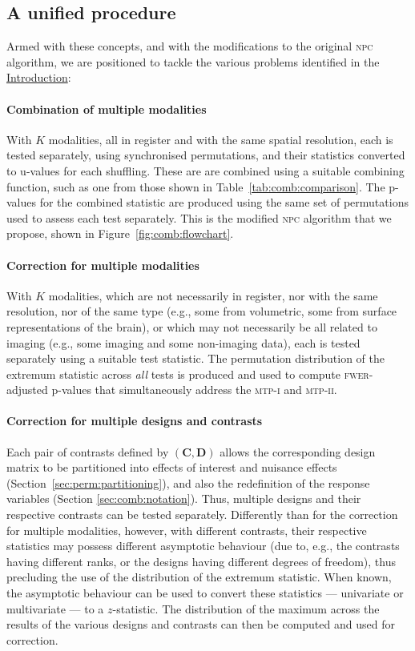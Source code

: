 \subsection{A unified procedure}

Armed with these concepts, and with the modifications to the original \textsc{npc} algorithm, we are positioned to tackle the various problems identified in the \href{sec:comb:intro}{Introduction}:

\paragraph{Combination of multiple modalities} With $K$ modalities, all in register and with the same spatial resolution, each is tested separately, using synchronised permutations, and their statistics converted to u-values for each shuffling. These are are combined using a suitable combining function, such as one from those shown in Table~\ref{tab:comb:comparison}. The p-values for the combined statistic are produced using the same set of permutations used to assess each test separately. This is the modified \textsc{npc} algorithm that we propose, shown in Figure~\ref{fig:comb:flowchart}.

\paragraph{Correction for multiple modalities} With $K$ modalities, which are not necessarily in register, nor with the same resolution, nor of the same type (e.g., some from volumetric, some from surface representations of the brain), or which may not necessarily be all related to imaging (e.g., some imaging and some non-imaging data), each is tested separately using a suitable test statistic. The permutation distribution of the extremum statistic across \emph{all} tests is produced and used to compute \textsc{fwer}-adjusted p-values that simultaneously address the \textsc{mtp-i} and \textsc{mtp-ii}.

\paragraph{Correction for multiple designs and contrasts} Each pair of contrasts defined by $\left(\mathbf{C}, \mathbf{D}\right)$ allows the corresponding design matrix to be partitioned into effects of interest and nuisance effects (Section~\ref{sec:perm:partitioning}), and also the redefinition of the response variables (Section \ref{sec:comb:notation}). Thus, multiple designs and their respective contrasts can be tested separately. Differently than for the correction for multiple modalities, however, with different contrasts, their respective statistics may possess different asymptotic behaviour (due to, e.g., the contrasts having different ranks, or the designs having different degrees of freedom), thus precluding the use of the distribution of the extremum statistic. When known, the asymptotic behaviour can be used to convert these statistics --- univariate or multivariate --- to a $z$-statistic. The distribution of the maximum across the results of the various designs and contrasts can then be computed and used for correction.

